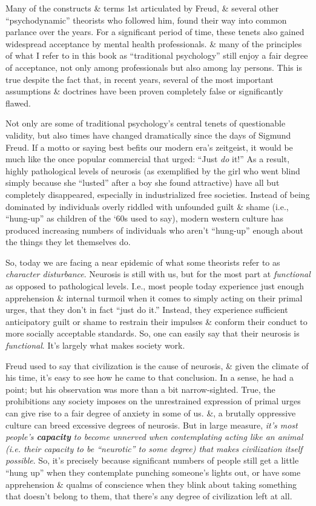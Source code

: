 \documentclass{article}
\numberwithin{equation}{section}
\begin{document}
Many of the constructs \& terms 1st articulated by Freud, \& several other ``psychodynamic'' theorists who followed him, found their way into common parlance over the years. For a significant period of time, these tenets also gained widespread acceptance by mental health professionals. \& many of the principles of what I refer to in this book as ``traditional psychology'' still enjoy a fair degree of acceptance, not only among professionals but also among lay persons. This is true despite the fact that, in recent years, several of the most important assumptions \& doctrines have been proven completely false or significantly flawed.

Not only are some of traditional psychology's central tenets of questionable validity, but also times have changed dramatically since the days of Sigmund Freud. If a motto or saying best befits our modern era's zeitgeist, it would be much like the once popular commercial that urged: ``Just \textit{do} it!'' As a result, highly pathological levels of neurosis (as exemplified by the girl who went blind simply because she ``lusted'' after a boy she found attractive) have all but completely disappeared, especially in industrialized free societies. Instead of being dominated by individuals overly riddled with unfounded guilt \& shame (i.e., ``hung-up'' as children of the `60s used to say), modern western culture has produced increasing numbers of individuals who aren't ``hung-up'' enough about the things they let themselves do.

So, today we are facing a near epidemic of what some theorists refer to as \textit{character disturbance}. Neurosis is still with us, but for the most part at \textit{functional} as opposed to pathological levels. I.e., most people today experience just enough apprehension \& internal turmoil when it comes to simply acting on their primal urges, that they don't in fact ``just do it.'' Instead, they experience sufficient anticipatory guilt or shame to restrain their impulses \& conform their conduct to more socially acceptable standards. So, one can easily say that their neurosis is \textit{functional}. It's largely what makes society work.

Freud used to say that civilization is the cause of neurosis, \& given the climate of his time, it's easy to see how he came to that conclusion. In a sense, he had a point; but his observation was more than a bit narrow-sighted. True, the prohibitions any society imposes on the unrestrained expression of primal urges can give rise to a fair degree of anxiety in some of us. \&, a brutally oppressive culture can breed excessive degrees of neurosis. But in large measure, \textit{it's most people's \textbf{capacity} to become unnerved when contemplating acting like an animal (i.e. their capacity to be ``neurotic'' to some degree) that makes civilization itself possible}. So, it's precisely because significant numbers of people still get a little ``hung up'' when they contemplate punching someone's lights out, or have some apprehension \& qualms of conscience when they blink about taking something that doesn't belong to them, that there's any degree of civilization left at all.
\end{document}
